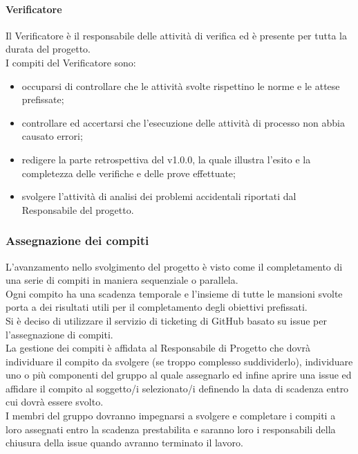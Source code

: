             \paragraph{Verificatore  }
                Il Verificatore è il responsabile delle attività di verifica ed è presente per tutta la durata del progetto. \\
                I compiti del Verificatore sono:\\
                \begin{itemize}
                    \item occuparsi di controllare che le attività svolte rispettino le norme e le attese prefissate;
                    \item controllare ed accertarsi che l’esecuzione delle attività di processo non abbia causato errori;
                    \item redigere la parte retrospettiva del  v1.0.0, la quale illustra l’esito e la completezza delle verifiche e delle prove effettuate;
                    \item svolgere l’attività di analisi dei problemi accidentali riportati dal Responsabile del progetto.
                \end{itemize}
        \subsubsection{Assegnazione dei compiti}
            L’avanzamento nello svolgimento del progetto è visto come il completamento di una serie di compiti in maniera sequenziale o parallela. \\
            Ogni compito ha una scadenza temporale e l’insieme di tutte le mansioni svolte porta a dei risultati utili per il completamento degli obiettivi prefissati.\\
            Si è deciso di utilizzare il servizio di ticketing di GitHub basato su issue per l’assegnazione di compiti.\\
            La gestione dei compiti è affidata al Responsabile di Progetto che dovrà individuare il compito da svolgere (se troppo complesso suddividerlo), individuare uno o più componenti del gruppo al quale assegnarlo ed infine aprire una issue ed affidare il compito al soggetto/i selezionato/i definendo la data di scadenza entro cui dovrà essere svolto.\\
            I membri del gruppo dovranno impegnarsi a svolgere e completare i compiti a loro assegnati entro la scadenza prestabilita e saranno loro i responsabili della chiusura della issue quando avranno terminato il lavoro.\\
